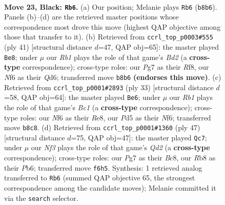 \documentclass[11pt]{article}
\begin{document}
\clearpage

\begin{figure}[p]\centering
\begin{subfigure}{0.46\textwidth}\centering
\resizebox{\linewidth}{!}{%
\newchessgame
\chessboard[
  setfen={rr1qb1k1/p4ppp/B4n2/p2pN3/3Q2PP/1P6/P4P2/R3R1K1 b - - 2 23},
  showmover=false,
  pgfstyle=straightmove, color=movearrow, markmove={b8-b6}
]}
\caption{}
\end{subfigure}\hfill
\begin{subfigure}{0.46\textwidth}\centering
\resizebox{\linewidth}{!}{%
\newchessgame
\chessboard[
  setfen={r4rk1/pp1b2pp/3qpn2/3p4/3Q1P2/P1N5/1PP1B1PP/R4R1K b - - 1 21},
  showmover=false,
  pgfstyle=straightmove, color=movearrow, markmove={d7-e8}
]}
\caption{}
\end{subfigure}
\\[4pt]
\begin{subfigure}{0.46\textwidth}\centering
\resizebox{\linewidth}{!}{%
\newchessgame
\chessboard[
  setfen={r1bqr1k1/pp3ppp/5n2/3p4/3Q4/2NP1B2/PPP3PP/R4R1K b - - 0 17},
  showmover=false,
  pgfstyle=straightmove, color=movearrow, markmove={c8-e6}
]}
\caption{}
\end{subfigure}\hfill
\begin{subfigure}{0.46\textwidth}\centering
\resizebox{\linewidth}{!}{%
\newchessgame
\chessboard[
  setfen={2b2rk1/p2q1pp1/1p1n3p/2rP4/5QPP/3BN3/P4P2/3RR1K1 b - - 0 24},
  showmover=false,
  pgfstyle=straightmove, color=movearrow, markmove={d7-c7}
]}
\caption{}
\end{subfigure}
\caption{\textbf{Move 23, Black: \texttt{Rb6}.} (a) Our position; Melanie plays \texttt{Rb6} (\texttt{b8b6}). Panels (b)--(d) are the retrieved master positions whose correspondence most drove this move (highest QAP objective among those that transfer to it). (b) Retrieved from \texttt{ccrl\_top\_p0003\#555} (ply 41) [structural distance $d$=47, QAP obj=65]: the master played \texttt{Be8}; under $\mu$ our \emph{Rb1} plays the role of that game's \emph{Bd2} (a \textbf{cross-type} correspondence); cross-type roles: our \emph{P}g7 as their \emph{R}f8, our \emph{N}f6 as their \emph{Q}d6; transferred move \texttt{b8b6} \textbf{(endorses this move)}. (c) Retrieved from \texttt{ccrl\_top\_p0001\#2893} (ply 33) [structural distance $d$=58, QAP obj=64]: the master played \texttt{Be6}; under $\mu$ our \emph{Rb1} plays the role of that game's \emph{Bc1} (a \textbf{cross-type} correspondence); cross-type roles: our \emph{N}f6 as their \emph{R}e8, our \emph{P}d5 as their \emph{N}f6; transferred move \texttt{b8c8}. (d) Retrieved from \texttt{ccrl\_top\_p0001\#1360} (ply 47) [structural distance $d$=75, QAP obj=47]: the master played \texttt{Qc7}; under $\mu$ our \emph{Nf3} plays the role of that game's \emph{Qd2} (a \textbf{cross-type} correspondence); cross-type roles: our \emph{P}g7 as their \emph{B}c8, our \emph{R}b8 as their \emph{P}b6; transferred move \texttt{f6h5}. Synthesis: 1 retrieved analog transferred to \texttt{Rb6} (summed QAP objective 65, the strongest correspondence among the candidate moves); Melanie committed it via the \texttt{search} selector.}
\label{fig:thought-m45}
\end{figure}
\end{document}
